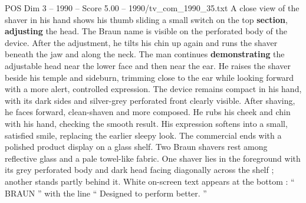 \begin{textsample}{POS Dim 3 – 1990 – Score 5.00 – 1990/tv\_com\_1990\_35.txt}
A close view of the shaver in his hand shows his thumb sliding a small switch on the top \textbf{section}, \textbf{adjusting} the head.
The Braun name is visible on the perforated body of the device.
After the adjustment, he tilts his chin up again and runs the shaver beneath the jaw and along the neck.
The man continues \textbf{demonstrating} the adjustable head near the lower face and then near the ear.
He raises the shaver beside his temple and sideburn, trimming close to the ear while looking forward with a more alert, controlled expression.
The device remains compact in his hand, with its dark sides and silver-grey perforated front clearly visible.
After shaving, he faces forward, clean-shaven and more composed.
He rubs his cheek and chin with his hand, checking the smooth result.
His expression softens into a small, satisfied smile, replacing the earlier sleepy look.
The commercial ends with a polished product display on a glass shelf.
Two Braun shavers rest among reflective glass and a pale towel-like fabric.
One shaver lies in the foreground with its grey perforated body and dark head facing diagonally across the shelf ; another stands partly behind it.
White on-screen text appears at the bottom : “ BRAUN ” with the line “ Designed to perform better. ”

\end{textsample}
